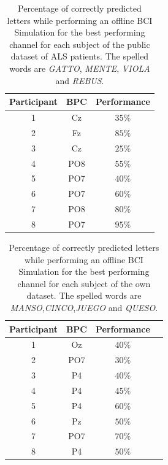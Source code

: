 \documentclass[utf8]{frontiersSCNS} %
\begin{document}
\begin{table}[htb]
\caption{Percentage of correctly predicted letters while performing an offline BCI Simulation for the best performing channel for each subject of the public dataset of ALS patients. The spelled words are \textit{GATTO}, \textit{MENTE}, \textit{VIOLA} and \textit{REBUS}. }
\centering
\begin{tabular}{ccc}
\toprule
\textbf{Participant}	&  \textbf{BPC}	& \textbf{Performance}\\
\midrule
1     &     Cz   &   $35\%$  \\
2     &     Fz   &   $85\%$  \\
3     &     Cz   &   $25\%$  \\
4     &     PO8 &   $55\%$  \\
5     &     PO7 &   $40\%$ \\
6     &     PO7 &   $60\%$  \\
7     &     PO8 &   $80\%$  \\
8     &     PO7 &   $95\%$ \\

\end{tabular}
\label{tab:results}
\end{table}


\begin{table}[htb]
\caption{Percentage of correctly predicted letters while performing an offline BCI Simulation for the best performing channel for each subject of the own dataset. The spelled words are \textit{MANSO},\textit{CINCO},\textit{JUEGO} and \textit{QUESO}. }
\centering
\begin{tabular}{cccc}
\toprule
\textbf{Participant}	&  \textbf{BPC}	& \textbf{Performance}\\
\midrule
1     &     Oz   &     $40\%$  \\
2     &     PO7   &     $30\%$ \\
3     &     P4   &     $40\%$ \\
4     &     P4   &     $45\%$ \\
5     &     P4   &      $60\%$ \\
6     &     Pz   &      $50\%$ \\
7     &     PO7   &      $70\%$ \\
8     &     P4   &      $50\%$ \\

\end{tabular}
\label{tab:resultsowndataset}
\end{table}
\end{document}

